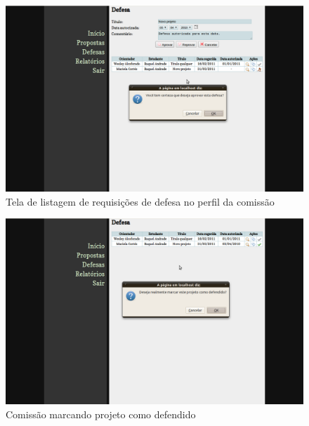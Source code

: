 \begin{figure}[htbp]
\centering
\includegraphics[width=1\textwidth]{fig/telas/processo/comissao_05_aprovando_defesa.png}
\caption{Tela de listagem de requisições de defesa no perfil da comissão}
\label{fig:comissao_05_aprovando_defesa}
\end{figure}

\begin{figure}[htbp]
\centering
\includegraphics[width=1\textwidth]{fig/telas/processo/comissao_06_marcando_projeto_como_defendido.png}
\caption{Comissão marcando projeto como defendido}
\label{fig:comissao_06_marcando_projeto_como_defendido}
\end{figure}

